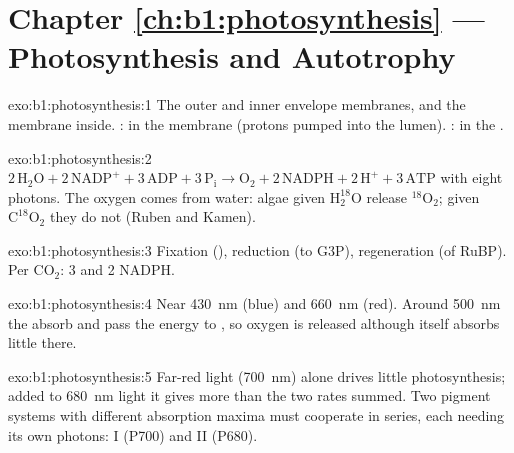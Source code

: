 \section*{Chapter \ref{ch:b1:photosynthesis} --- Photosynthesis and Autotrophy}

\begin{solution}{exo:b1:photosynthesis:1}
The outer and inner envelope membranes, and the  membrane
inside. : in the  membrane (protons pumped into
the lumen). : in the .
\end{solution}

\begin{solution}{exo:b1:photosynthesis:2}
$2\,\mathrm{H_2O} + 2\,\mathrm{NADP^+} + 3\,\mathrm{ADP} + 3\,\mathrm{P_i}
\to \mathrm{O_2} + 2\,\mathrm{NADPH} + 2\,\mathrm{H^+} + 3\,\mathrm{ATP}$
with eight photons. The oxygen comes from water: algae given
$\mathrm{H_2^{18}O}$ release $\mathrm{^{18}O_2}$; given
$\mathrm{C^{18}O_2}$ they do not (Ruben and Kamen).
\end{solution}

\begin{solution}{exo:b1:photosynthesis:3}
Fixation (), reduction (to G3P), regeneration (of RuBP). Per
$\mathrm{CO_2}$: 3  and 2 NADPH.
\end{solution}

\begin{solution}{exo:b1:photosynthesis:4}
Near \qty{430}{nm} (blue) and \qty{660}{nm} (red). Around \qty{500}{nm}
the  absorb and pass the energy to , so oxygen is
released although  itself absorbs little there.
\end{solution}

\begin{solution}{exo:b1:photosynthesis:5}
Far-red light (\qty{700}{nm}) alone drives little photosynthesis;
added to \qty{680}{nm} light it gives more than the two rates summed.
Two pigment systems with different absorption maxima must cooperate in
series, each needing its own photons:  I (P700) and
 II (P680).
\end{solution}

